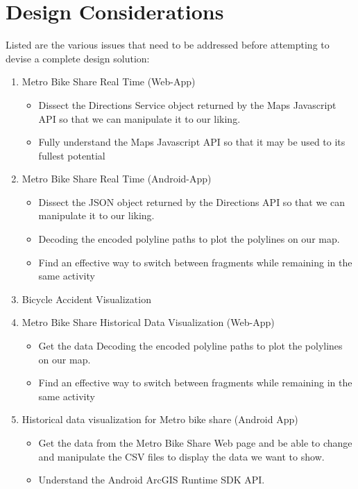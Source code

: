 \documentclass[a4paper,12pt]{article}
\begin{document}
\section{Design Considerations}
Listed are the various issues that need to be addressed before attempting to devise a complete design solution:
\begin{enumerate}
    \item Metro Bike Share Real Time (Web-App)                  
    \begin{itemize}
        \item Dissect the Directions Service object returned by the Maps Javascript API so that we can manipulate it to our liking.
        \item Fully understand the Maps Javascript API so that it may be used to its fullest potential    
    \end{itemize}
    \item Metro Bike Share Real Time (Android-App)
        \begin{itemize}
            \item Dissect the JSON object returned by the Directions API so that we can manipulate it to our liking.
            \item  Decoding the encoded polyline paths to plot the polylines on our map.
            \item Find an effective way to switch between fragments while remaining in the same activity \end{itemize}
    \item Bicycle Accident Visualization
    \item Metro Bike Share Historical Data Visualization (Web-App)
        \begin{itemize}
            \item Get the data  Decoding the encoded polyline paths to plot the polylines on our map.
            \item Find an effective way to switch between fragments while remaining in the same activity \end{itemize}
    \item Historical data visualization for Metro bike share (Android App) 
        \begin{itemize}
            \item Get the data from the Metro Bike Share Web page and be able to change and manipulate the CSV files to display the data we want to show.
            \item Understand the Android ArcGIS Runtime SDK API.
        \end{itemize}
\end{enumerate}
\end{document}
